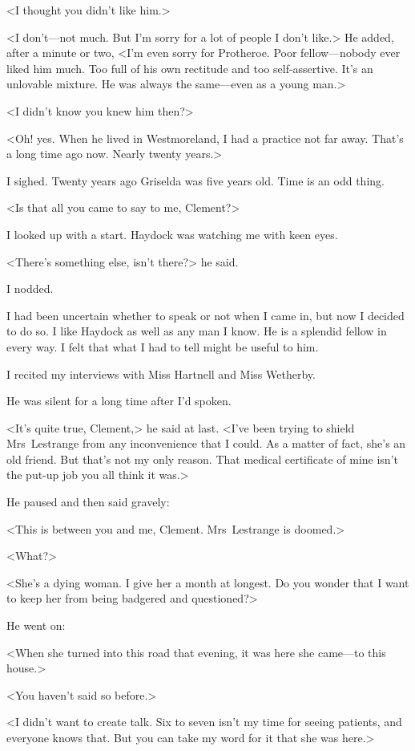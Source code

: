 <I thought you didn't like him.>

<I don't—not much. But I'm sorry for a lot of people I don't like.> He added, after a minute or two, <I'm even sorry for Protheroe. Poor fellow—nobody ever liked him much. Too full of his own rectitude and too self-assertive. It's an unlovable mixture. He was always the same—even as a young man.>

<I didn't know you knew him then?>

<Oh! yes. When he lived in Westmoreland, I had a practice not far away. That's a long time ago now. Nearly twenty years.>

I sighed. Twenty years ago Griselda was five years old. Time is an odd thing.

<Is that all you came to say to me, Clement?>

I looked up with a start. Haydock was watching me with keen eyes.

<There's something else, isn't there?> he said.

I nodded.

I had been uncertain whether to speak or not when I came in, but now I decided to do so. I like Haydock as well as any man I know. He is a splendid fellow in every way. I felt that what I had to tell might be useful to him.

I recited my interviews with Miss Hartnell and Miss Wetherby.

He was silent for a long time after I'd spoken.

<It's quite true, Clement,> he said at last. <I've been trying to shield Mrs~Lestrange from any inconvenience that I could. As a matter of fact, she's an old friend. But that's not my only reason. That medical certificate of mine isn't the put-up job you all think it was.>

He paused and then said gravely:

<This is between you and me, Clement. Mrs~Lestrange is doomed.>

<What?>

<She's a dying woman. I give her a month at longest. Do you wonder that I want to keep her from being badgered and questioned?>

He went on:

<When she turned into this road that evening, it was here she came—to this house.>

<You haven't said so before.>

<I didn't want to create talk. Six to seven isn't my time for seeing patients, and everyone knows that. But you can take my word for it that she was here.>

